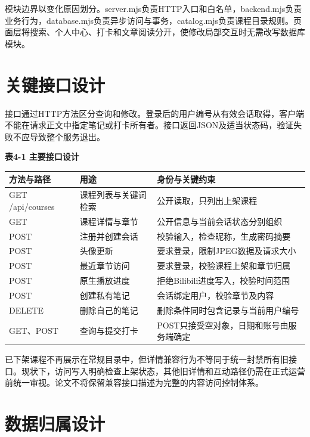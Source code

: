 \documentclass[UTF8,12pt,a4paper,oneside,openany]{ctexbook}
\begin{document}
模块边界以变化原因划分。server.mjs负责HTTP入口和白名单，backend.mjs负责业务行为，database.mjs负责异步访问与事务，catalog.mjs负责课程目录规则。页面层将搜索、个人中心、打卡和文章阅读分开，使修改局部交互时无需改写数据库模块。


\section{关键接口设计}

接口通过HTTP方法区分查询和修改。登录后的用户编号从有效会话取得，客户端不能在请求正文中指定笔记或打卡所有者。接口返回JSON及适当状态码，验证失败不应导致整个服务退出。



\noindent\textbf{表4-1 主要接口设计}

{\small
\begin{longtable}{P{0.32\textwidth}P{0.24\textwidth}P{0.32\textwidth}}
\toprule
方法与路径 & 用途 & 身份与关键约束 \\
\midrule
\endhead
GET /api/courses & 课程列表与关键词检索 & 公开读取，只列出上架课程 \\
GET  & 课程详情与章节 & 公开信息与当前会话状态分别组织 \\
POST  & 注册并创建会话 & 校验输入，检查昵称，生成密码摘要 \\
POST  & 头像更新 & 要求登录，限制JPEG数据及请求大小 \\
POST  & 最近章节访问 & 要求登录，校验课程上架和章节归属 \\
POST  & 原生播放进度 & 拒绝Bilibili进度写入，校验时间范围 \\
POST  & 创建私有笔记 & 会话绑定用户，校验章节及内容 \\
DELETE  & 删除自己的笔记 & 删除条件同时包含记录与当前用户编号 \\
GET、POST  & 查询与提交打卡 & POST只接受空对象，日期和账号由服务端确定 \\
\bottomrule
\end{longtable}}

已下架课程不再展示在常规目录中，但详情兼容行为不等同于统一封禁所有旧接口。现状下，访问写入明确检查上架状态，其他旧详情和互动路径仍需在正式运营前统一审视。论文不将保留兼容接口描述为完整的内容访问控制体系。


\section{数据归属设计}
\end{document}
